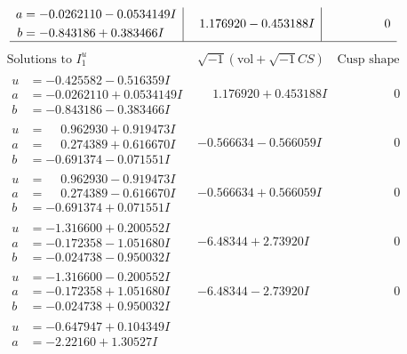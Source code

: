 \documentclass[1p]{elsarticle_modified}
\theoremstyle{definition}
\newcommand{\I}{\sqrt{-1}}
\begin{document}
$$\begin{array}{c|c|c}
\begin{aligned}
a &= -0.0262110 - 0.0534149 I \\
b &= -0.843186 + 0.383466 I\end{aligned}
 & \phantom{-}1.176920 - 0.453188 I & \phantom{-0.000000 } 0\\
 \hline 
 \end{array}$$\newpage$$\begin{array}{c|c|c}  
\text{Solutions to }I^u_{1}& \I (\text{vol} + \sqrt{-1}CS) & \text{Cusp shape}\\
 \hline 
\begin{aligned}
u &= -0.425582 - 0.516359 I \\
a &= -0.0262110 + 0.0534149 I \\
b &= -0.843186 - 0.383466 I\end{aligned}
 & \phantom{-}1.176920 + 0.453188 I & \phantom{-0.000000 } 0 \\ \hline\begin{aligned}
u &= \phantom{-}0.962930 + 0.919473 I \\
a &= \phantom{-}0.274389 + 0.616670 I \\
b &= -0.691374 - 0.071551 I\end{aligned}
 & -0.566634 - 0.566059 I & \phantom{-0.000000 } 0 \\ \hline\begin{aligned}
u &= \phantom{-}0.962930 - 0.919473 I \\
a &= \phantom{-}0.274389 - 0.616670 I \\
b &= -0.691374 + 0.071551 I\end{aligned}
 & -0.566634 + 0.566059 I & \phantom{-0.000000 } 0 \\ \hline\begin{aligned}
u &= -1.316600 + 0.200552 I \\
a &= -0.172358 - 1.051680 I \\
b &= -0.024738 - 0.950032 I\end{aligned}
 & -6.48344 + 2.73920 I & \phantom{-0.000000 } 0 \\ \hline\begin{aligned}
u &= -1.316600 - 0.200552 I \\
a &= -0.172358 + 1.051680 I \\
b &= -0.024738 + 0.950032 I\end{aligned}
 & -6.48344 - 2.73920 I & \phantom{-0.000000 } 0 \\ \hline\begin{aligned}
u &= -0.647947 + 0.104349 I \\
a &= -2.22160 + 1.30527 I \\

\end{aligned}
\end{array}$$
\end{document}
